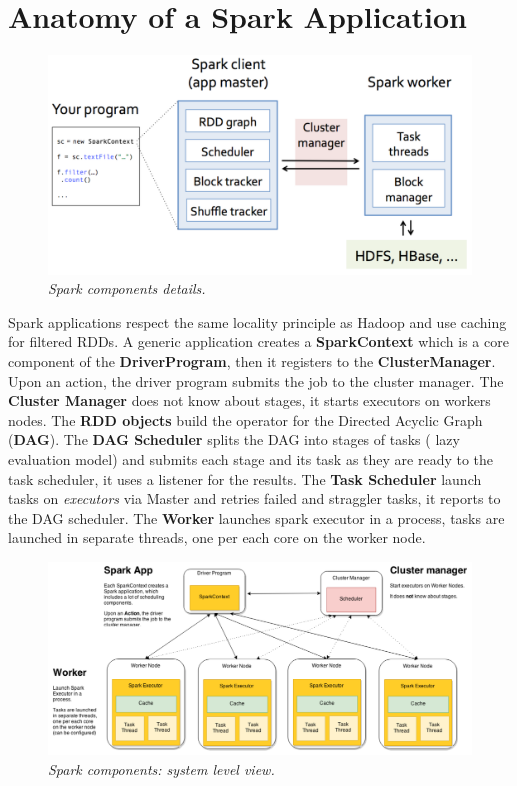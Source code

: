 \section{Anatomy of a Spark Application}
	\par
	\begin{figure}[H]
		\centering
		\includegraphics[width=\linewidth]{images/sparkcomp.png}
		\caption{\textit{Spark components details.}}
	\end{figure}
	Spark applications respect the same locality principle as Hadoop and use caching for filtered RDDs.
	\newline
	A generic application creates a \textbf{SparkContext} which is a core component of the \textbf{DriverProgram}, then it registers to the \textbf{ClusterManager}. Upon an action, the driver program submits the job to the cluster manager.
	\newline
	The \textbf{Cluster Manager} does not know about stages, it starts executors on workers nodes.
	\newline
	The \textbf{RDD objects} build the operator for the Directed Acyclic Graph (\textbf{DAG}).
	\newline
	The \textbf{DAG Scheduler} splits the DAG into stages of tasks (	lazy evaluation model) and submits each stage and its task as they are ready to the task scheduler, it uses a listener for the results.
	\newline
	The \textbf{Task Scheduler} launch tasks on \textit{executors} via Master and retries failed and straggler tasks, it reports to the DAG scheduler.
	\newline
	The \textbf{Worker} launches spark executor in a process, tasks are launched in separate threads, one per each core on the worker node.
	\begin{figure}[H]
		\centering
		\includegraphics[width=\linewidth]{images/sparkcompsys.png}
		\caption{\textit{Spark components: system level view.}}
	\end{figure}
